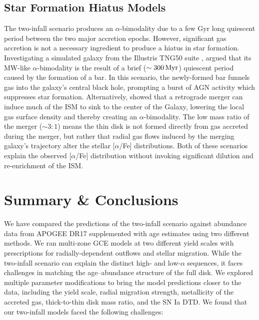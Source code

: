 \documentclass[twocolumn,twocolappendix]{aastex701}
\newcommand{\aFe}{[$\alpha$/Fe]\xspace}
\begin{document}
\subsection{Star Formation Hiatus Models}
\label{sec:sfe-hiatus}

The two-infall scenario produces an $\alpha$-bimodality due to a few Gyr long quiescent period between the two major accretion epochs. However, significant gas accretion is not a necessary ingredient to produce a hiatus in star formation. Investigating a simulated galaxy from the Illustris TNG50 suite \citep{pillepich_first_2019,nelson_first_2019,nelson_illustristng_2019}, \citet{beane_rising_2024} argued that its MW-like $\alpha$-bimodality is the result of a brief ($\sim300\,{\rm Myr}$) quiescent period caused by the formation of a bar. In this scenario, the newly-formed bar funnels gas into the galaxy's central black hole, prompting a burst of AGN activity which suppresses star formation. Alternatively, \citet{johnson_thats_2025} showed that a retrograde merger can induce much of the ISM to sink to the center of the Galaxy, lowering the local gas surface density and thereby creating an $\alpha$-bimodality. The low mass ratio of the merger ($\sim3:1$) means the thin disk is not formed directly from gas accreted during the merger, but rather that radial gas flows induced by the merging galaxy's trajectory alter the stellar \aFe distributions. Both of these scenarios explain the observed \aFe distribution without invoking significant dilution and re-enrichment of the ISM.

\section{Summary \& Conclusions}
\label{sec:conclusions}

We have compared the predictions of the two-infall scenario against abundance data from APOGEE DR17 supplemented with age estimates using two different methods. We ran multi-zone GCE models at two different yield scales with prescriptions for radially-dependent outflows and stellar migration. While the two-infall scenario can explain the distinct high- and low-$\alpha$ sequences, it faces challenges in matching the age--abundance structure of the full disk. We explored multiple parameter modifications to bring the model predictions closer to the data, including the yield scale, radial migration strength, metallicity of the accreted gas, thick-to-thin disk mass ratio, and the SN Ia DTD. We found that our two-infall models faced the following challenges:
\end{document}
